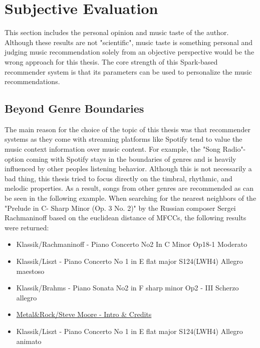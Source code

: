 \section{Subjective Evaluation}

This section includes the personal opinion and music taste of the author. Although these results are not "scientific", music taste is something personal and judging music recommendation solely from an objective perspective would be the wrong approach for this thesis. The core strength of this Spark-based recommender system is that its parameters can be used to personalize the music recommendations. 

\subsection{Beyond Genre Boundaries}

The main reason for the choice of the topic of this thesis was that recommender systems as they come with streaming platforms like Spotify tend to value the music context information over music content. For example, the "Song Radio"- option coming with Spotify stays in the boundaries of genres and is heavily influenced by other peoples listening behavior. Although this is not necessarily a bad thing, this thesis tried to focus directly on the timbral, rhythmic, and melodic properties. As a result, songs from other genres are recommended as can be seen in the following example. 
\noindent When searching for the nearest neighbors of the "Prelude in C- Sharp Minor (Op. 3 No. 2)" by the Russian composer Sergei Rachmaninoff based on the euclidean distance of MFCCs, the following results were returned: 

\begin{itemize}
	\setlength\itemsep{-0.5em}
	\item Klassik/Rachmaninoff - Piano Concerto No2 In C Minor Op18-1 Moderato
	\item Klassik/Liszt - Piano Concerto No 1 in E flat major S124(LWH4) Allegro maestoso
	\item Klassik/Brahms - Piano Sonata No2 in F sharp minor Op2 - III Scherzo allegro
	\item \underline{Metal\&Rock/Steve Moore - Intro \& Credits}
	\item Klassik/Liszt - Piano Concerto No 1 in E flat major S124(LWH4) Allegro animato
\end{itemize}

